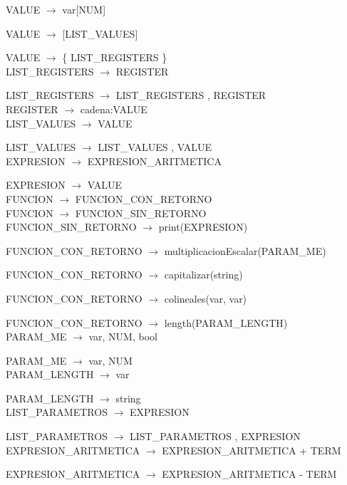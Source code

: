 \documentclass[10pt,a4paper]{article}
\begin{document}
VALUE $\rightarrow$ var[NUM]    

VALUE $\rightarrow$ [LIST\_VALUES]   

VALUE $\rightarrow$ \{ LIST\_REGISTERS \}\\

LIST\_REGISTERS $\rightarrow$ REGISTER  

LIST\_REGISTERS $\rightarrow$ LIST\_REGISTERS , REGISTER \\

REGISTER $\rightarrow$ cadena:VALUE \\

LIST\_VALUES $\rightarrow$ VALUE   

LIST\_VALUES $\rightarrow$ LIST\_VALUES , VALUE \\

EXPRESION $\rightarrow$ EXPRESION\_ARITMETICA   

EXPRESION $\rightarrow$ VALUE \\

FUNCION $\rightarrow$ FUNCION\_CON\_RETORNO \\

FUNCION $\rightarrow$ FUNCION\_SIN\_RETORNO \\

FUNCION\_SIN\_RETORNO $\rightarrow$ print(EXPRESION)   

FUNCION\_CON\_RETORNO $\rightarrow$ multiplicacionEscalar(PARAM\_ME)   

FUNCION\_CON\_RETORNO $\rightarrow$ capitalizar(string)   

FUNCION\_CON\_RETORNO $\rightarrow$ colineales(var, var)   

FUNCION\_CON\_RETORNO $\rightarrow$ length(PARAM\_LENGTH) \\

PARAM\_ME $\rightarrow$ var, NUM, bool   

PARAM\_ME $\rightarrow$ var, NUM \\

PARAM\_LENGTH $\rightarrow$ var    

PARAM\_LENGTH $\rightarrow$ string \\

LIST\_PARAMETROS $\rightarrow$ EXPRESION   

LIST\_PARAMETROS $\rightarrow$ LIST\_PARAMETROS , EXPRESION \\

EXPRESION\_ARITMETICA $\rightarrow$ EXPRESION\_ARITMETICA + TERM   

EXPRESION\_ARITMETICA $\rightarrow$ EXPRESION\_ARITMETICA - TERM  
\end{document}
